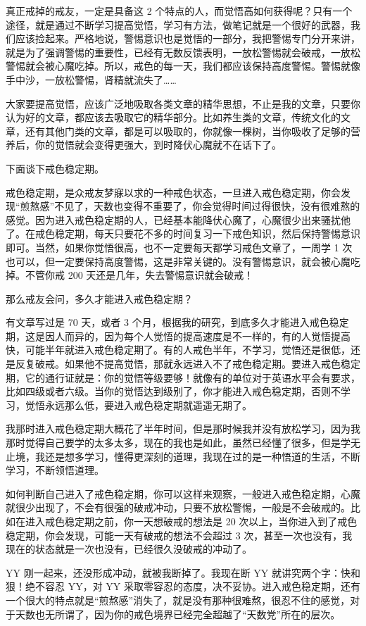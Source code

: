 \documentclass[fontset=founder]{ctexart}
\begin{document}
真正戒掉的戒友，一定是具备这 2 个特点的人，而觉悟高如何获得呢？只有一个途径，就是通过不断学习提高觉悟，学习有方法，做笔记就是一个很好的武器，我们应该捡起来。严格地说，警惕意识也是觉悟的一部分，我把警惕专门分开来讲，就是为了强调警惕的重要性，已经有无数反馈表明，一放松警惕就会破戒，一放松警惕就会被心魔吃掉。所以，戒色的每一天，我们都应该保持高度警惕。警惕就像手中沙，一放松警惕，肾精就流失了……

大家要提高觉悟，应该广泛地吸取各类文章的精华思想，不止是我的文章，只要你认为好的文章，都应该去吸取它的精华部分。比如养生类的文章，传统文化的文章，还有其他门类的文章，都是可以吸取的，你就像一棵树，当你吸收了足够的营养后，你的觉悟就会变得更强大，到时降伏心魔就不在话下了。

下面谈下戒色稳定期。

戒色稳定期，是众戒友梦寐以求的一种戒色状态，一旦进入戒色稳定期，你会发现“煎熬感”不见了，天数也变得不重要了，你会觉得时间过得很快，没有很难熬的感觉。因为进入戒色稳定期的人，已经基本能降伏心魔了，心魔很少出来骚扰他了。在戒色稳定期，每天只要花不多的时间复习一下戒色知识，然后保持警惕意识即可。当然，如果你觉悟很高，也不一定要每天都学习戒色文章了，一周学 1 次也可以，但一定要保持高度警惕，这是非常关键的。没有警惕意识，就会被心魔吃掉。不管你戒 200 天还是几年，失去警惕意识就会破戒！

那么戒友会问，多久才能进入戒色稳定期？

有文章写过是 70 天，或者 3 个月，根据我的研究，到底多久才能进入戒色稳定期，这是因人而异的，因为每个人觉悟的提高速度是不一样的，有的人觉悟提高快，可能半年就进入戒色稳定期了。有的人戒色半年，不学习，觉悟还是很低，还是反复破戒。如果他不提高觉悟，那就永远进入不了戒色稳定期。要进入戒色稳定期，它的通行证就是：你的觉悟等级要够！就像有的单位对于英语水平会有要求，比如四级或者六级。当你的觉悟达到级别了，你才能进入戒色稳定期，否则不学习，觉悟永远那么低，要进入戒色稳定期就遥遥无期了。

我那时进入戒色稳定期大概花了半年时间，但是那时候我并没有放松学习，因为我那时觉得自己要学的太多太多，现在的我也是如此，虽然已经懂了很多，但是学无止境，我还是想多学习，懂得更深刻的道理，我现在过的是一种悟道的生活，不断学习，不断领悟道理。

如何判断自己进入了戒色稳定期，你可以这样来观察，一般进入戒色稳定期，心魔就很少出现了，不会有很强的破戒冲动，只要不放松警惕，一般是不会破戒的。比如在进入戒色稳定期之前，你一天想破戒的想法是 20 次以上，当你进入到了戒色稳定期，你会发现，可能一天有破戒的想法不会超过 3 次，甚至一次也没有，我现在的状态就是一次也没有，已经很久没破戒的冲动了。

YY 刚一起来，还没形成冲动，就被我断掉了。我现在断 YY 就讲究两个字：快和狠！绝不容忍 YY，对 YY 采取零容忍的态度，决不妥协。进入戒色稳定期，还有一个很大的特点就是“煎熬感”消失了，就是没有那种很难熬，很忍不住的感觉，对于天数也无所谓了，因为你的戒色境界已经完全超越了“天数党”所在的层次。
\end{document}

